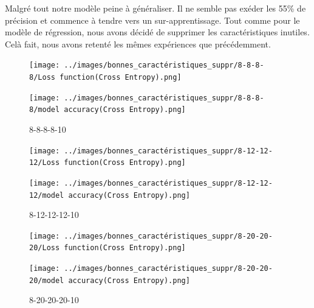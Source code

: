 
Malgré tout notre modèle peine à généraliser. Il ne semble pas exéder les 55\% de précision et commence à tendre vers un sur-apprentissage.
Tout comme pour le modèle de régression, nous avons décidé de supprimer les caractéristiques inutiles.
Celà fait, nous avons retenté les mêmes expériences que précédemment.

\vspace{1cm}

\begin{figure}[!htb]
    \begin{minipage}{0.5\textwidth}
        \centering
        \texttt{[image: ../images/bonnes\_caractéristiques\_suppr/8-8-8-8/Loss function(Cross Entropy).png]}
        \label{fig:8-8-8-8-10}
    \end{minipage}\hfill
    \begin{minipage}{0.5\textwidth}
        \centering
        \texttt{[image: ../images/bonnes\_caractéristiques\_suppr/8-8-8-8/model accuracy(Cross Entropy).png]}
        \label{fig:8-8-8-8-10.2}
    \end{minipage}
    \caption{8-8-8-8-10}
\end{figure}

\begin{figure}[!htb]
    \begin{minipage}{0.5\textwidth}
        \centering
        \texttt{[image: ../images/bonnes\_caractéristiques\_suppr/8-12-12-12/Loss function(Cross Entropy).png]}
        \label{fig:8-12-12-12-10}
    \end{minipage}\hfill
    \begin{minipage}{0.5\textwidth}
        \centering
        \texttt{[image: ../images/bonnes\_caractéristiques\_suppr/8-12-12-12/model accuracy(Cross Entropy).png]}
        \label{fig:8-12-12-12-10.2}
    \end{minipage}
    \caption{8-12-12-12-10}
\end{figure}

\begin{figure}[!htb]
    \begin{minipage}{0.5\textwidth}
        \centering
        \texttt{[image: ../images/bonnes\_caractéristiques\_suppr/8-20-20-20/Loss function(Cross Entropy).png]}
        \label{fig:8-20-20-20-10}
    \end{minipage}\hfill
    \begin{minipage}{0.5\textwidth}
        \centering
        \texttt{[image: ../images/bonnes\_caractéristiques\_suppr/8-20-20-20/model accuracy(Cross Entropy).png]}
        \label{fig:8-20-20-20-10.2}
    \end{minipage}
    \caption{8-20-20-20-10}
\end{figure}

